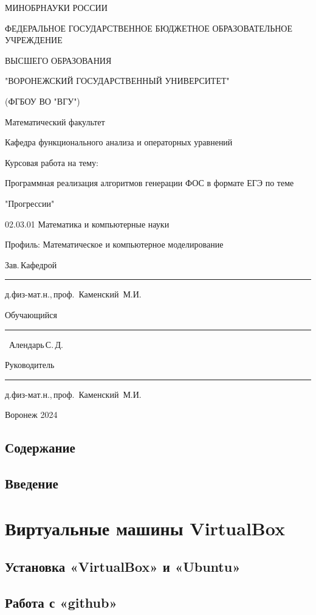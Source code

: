 \documentclass[oneside,final,12pt]{extarticle} %
\begin{document}
\begin{titlepage}
\centerline{МИНОБРНАУКИ РОССИИ}
\centerline{ФЕДЕРАЛЬНОЕ ГОСУДАРСТВЕННОЕ БЮДЖЕТНОЕ ОБРАЗОВАТЕЛЬНОЕ УЧРЕЖДЕНИЕ}
\centerline{ВЫСШЕГО ОБРАЗОВАНИЯ}
\centerline{"ВОРОНЕЖСКИЙ ГОСУДАРСТВЕННЫЙ УНИВЕРСИТЕТ"}
\centerline{(ФГБОУ ВО "ВГУ")}
\vfill
\centerline{Математический факультет}
\centerline{Кафедра функционального анализа и операторных уравнений}
\vfill
\centerline{Курсовая работа на тему:}
\centerline{Программная реализация алгоритмов генерации ФОС в формате ЕГЭ по теме}
\centerline{"Прогрессии"}
\centerline{02.03.01 Математика и компьютерные науки}
\centerline{Профиль: Математическое и компьютерное моделирование}
\vfill
\null\hfill
\begin{minipage}{0.85\textwidth}
	Зав.\,Кафедрой\,
	\rule{1.5cm}{0.25pt} д.физ-мат.н.,\,проф.\, Каменский~М.И.
	\par
	\medskip
	Обучающийся\,
	\rule{1.5cm}{0.25pt} \qquad\qquad\qquad\qquad\quad\quad\ Алендарь\,С.\,Д.
	\par
	\medskip
	Руководитель\,
	\rule{1.5cm}{0.25pt} д.физ-мат.н.,\,проф.\, Каменский~М.И.
	\par
	\medskip
\end{minipage}
\vfill
\centerline{Воронеж 2024}
\end{titlepage}
\setcounter{page}{2}

\section*{Содержание}

\newpage

\section*{Введение}
\newpage

\chapter{Виртуальные машины VirtualBox}
\section{Установка «VirtualBox» и «Ubuntu»}



\newpage
\section{Работа с «github»}

\newpage
\end{document}
